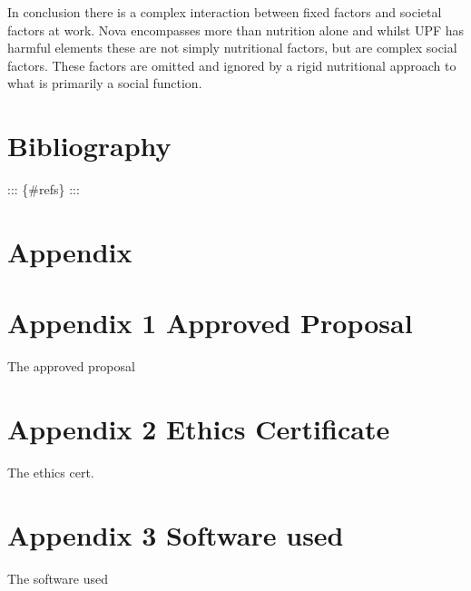 \documentclass[
]{article}
\begin{document}
In conclusion there is a complex interaction between fixed factors and
societal factors at work. Nova encompasses more than nutrition alone and
whilst UPF has harmful elements these are not simply nutritional
factors, but are complex social factors. These factors are omitted and
ignored by a rigid nutritional approach to what is primarily a social
function. \newpage

\hypertarget{bibliography}{%
\section{Bibliography}\label{bibliography}}

::: \{\#refs\} :::

\hypertarget{appendix}{%
\section*{Appendix}\label{appendix}}

\hypertarget{appendix-1-approved-proposal}{%
\section{Appendix 1 Approved
Proposal}\label{appendix-1-approved-proposal}}

The approved proposal

\hypertarget{appendix-2-ethics-certificate}{%
\section{Appendix 2 Ethics
Certificate}\label{appendix-2-ethics-certificate}}

The ethics cert.

\hypertarget{appendix-3-software-used}{%
\section{Appendix 3 Software used}\label{appendix-3-software-used}}

The software used
\end{document}
